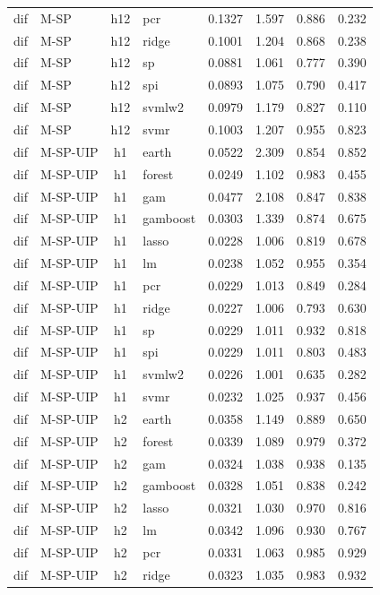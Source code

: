 \begin{ThreePartTable}
\begin{longtable}[t]{llclcccc}
dif & M-SP & h12 & pcr & 0.1327 & 1.597 & 0.886 & 0.232\\
dif & M-SP & h12 & ridge & 0.1001 & 1.204 & 0.868 & 0.238\\
dif & M-SP & h12 & sp & 0.0881 & 1.061 & 0.777 & 0.390\\
dif & M-SP & h12 & spi & 0.0893 & 1.075 & 0.790 & 0.417\\
dif & M-SP & h12 & svmlw2 & 0.0979 & 1.179 & 0.827 & 0.110\\
dif & M-SP & h12 & svmr & 0.1003 & 1.207 & 0.955 & 0.823\\
\addlinespace
dif & M-SP-UIP & h1 & earth & 0.0522 & 2.309 & 0.854 & 0.852\\
dif & M-SP-UIP & h1 & forest & 0.0249 & 1.102 & 0.983 & 0.455\\
dif & M-SP-UIP & h1 & gam & 0.0477 & 2.108 & 0.847 & 0.838\\
dif & M-SP-UIP & h1 & gamboost & 0.0303 & 1.339 & 0.874 & 0.675\\
dif & M-SP-UIP & h1 & lasso & 0.0228 & 1.006 & 0.819 & 0.678\\
dif & M-SP-UIP & h1 & lm & 0.0238 & 1.052 & 0.955 & 0.354\\
dif & M-SP-UIP & h1 & pcr & 0.0229 & 1.013 & 0.849 & 0.284\\
dif & M-SP-UIP & h1 & ridge & 0.0227 & 1.006 & 0.793 & 0.630\\
dif & M-SP-UIP & h1 & sp & 0.0229 & 1.011 & 0.932 & 0.818\\
dif & M-SP-UIP & h1 & spi & 0.0229 & 1.011 & 0.803 & 0.483\\
dif & M-SP-UIP & h1 & svmlw2 & 0.0226 & 1.001 & 0.635 & 0.282\\
dif & M-SP-UIP & h1 & svmr & 0.0232 & 1.025 & 0.937 & 0.456\\
\addlinespace
dif & M-SP-UIP & h2 & earth & 0.0358 & 1.149 & 0.889 & 0.650\\
dif & M-SP-UIP & h2 & forest & 0.0339 & 1.089 & 0.979 & 0.372\\
dif & M-SP-UIP & h2 & gam & 0.0324 & 1.038 & 0.938 & 0.135\\
dif & M-SP-UIP & h2 & gamboost & 0.0328 & 1.051 & 0.838 & 0.242\\
dif & M-SP-UIP & h2 & lasso & 0.0321 & 1.030 & 0.970 & 0.816\\
dif & M-SP-UIP & h2 & lm & 0.0342 & 1.096 & 0.930 & 0.767\\
dif & M-SP-UIP & h2 & pcr & 0.0331 & 1.063 & 0.985 & 0.929\\
dif & M-SP-UIP & h2 & ridge & 0.0323 & 1.035 & 0.983 & 0.932\\

\end{longtable}
\end{ThreePartTable}
